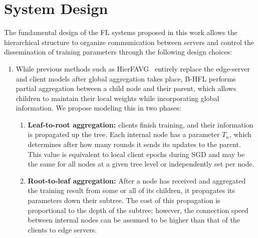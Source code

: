 \section{System Design}\label{sec:proposal:system_design}

The fundamental design of the FL systems proposed in this work allows the hierarchical structure to organize communication between servers and control the dissemination of training parameters through the following design choices:

\begin{enumerate}
    \item While previous methods such as HierFAVG~\citep{Client-Edge-CloudHierFL,Hier_Het_Cellular} entirely replace the edge-server and client models after global aggregation takes place, B-HFL performs partial aggregation between a child node and their parent, which allows children to maintain their local weights while incorporating global information. We propose modeling this in two phases:

          \begin{enumerate}
              \item \textbf{Leaf-to-root aggregation:} clients finish training, and their information is propagated up the tree. Each internal node has a parameter $T_n$, which determines after how many rounds it sends its updates to the parent. This value is equivalent to local client epochs during SGD and may be the same for all nodes at a given tree level or independently set per node.
              \item \textbf{Root-to-leaf aggregation:} After a node has received and aggregated the training result from some or all of its children, it propagates its parameters down their subtree. The cost of this propagation is proportional to the depth of the subtree; however, the connection speed between internal nodes can be assumed to be higher than that of the clients to edge servers.
          \end{enumerate}


\end{enumerate}
